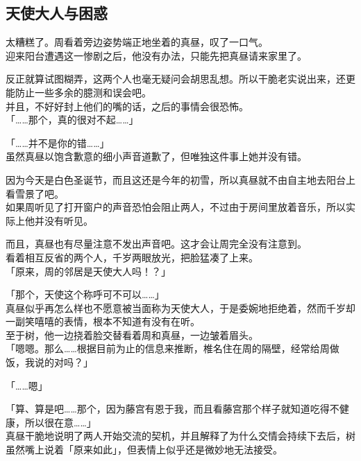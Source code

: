 \subsection{天使大人与困惑}

太糟糕了。周看着旁边姿势端正地坐着的真昼，叹了一口气。\\

迎来阳台遭遇这一惨剧之后，他没有办法，只能先把真昼请来家里了。

反正就算试图糊弄，这两个人也毫无疑问会胡思乱想。所以干脆老实说出来，还更能防止一些多余的臆测和误会吧。\\

并且，不好好封上他们的嘴的话，之后的事情会很恐怖。\\

「……那个，真的很对不起……」

「……并不是你的错……」\\

虽然真昼以饱含歉意的细小声音道歉了，但唯独这件事上她并没有错。

因为今天是白色圣诞节，而且这还是今年的初雪，所以真昼就不由自主地去阳台上看雪景了吧。\\

如果周听见了打开窗户的声音恐怕会阻止两人，不过由于房间里放着音乐，所以实际上他并没有听见。

而且，真昼也有尽量注意不发出声音吧。这才会让周完全没有注意到。\\

看着相互反省的两个人，千岁两眼放光，把脸猛凑了上来。\\

「原来，周的邻居是天使大人吗！？」

「那个，天使这个称呼可不可以……」\\

真昼似乎再怎么样也不愿意被当面称为天使大人，于是委婉地拒绝着，然而千岁却一副笑嘻嘻的表情，根本不知道有没有在听。\\

至于树，他一边挠着脸交替看着周和真昼，一边皱着眉头。\\

「嗯嗯。那么……根据目前为止的信息来推断，椎名住在周的隔壁，经常给周做饭，我说的对吗？」

「……嗯」

「算、算是吧……那个，因为藤宫有恩于我，而且看藤宫那个样子就知道吃得不健康，所以很在意……」\\

真昼干脆地说明了两人开始交流的契机，并且解释了为什么交情会持续下去后，树虽然嘴上说着「原来如此」，但表情上似乎还是微妙地无法接受。\\

